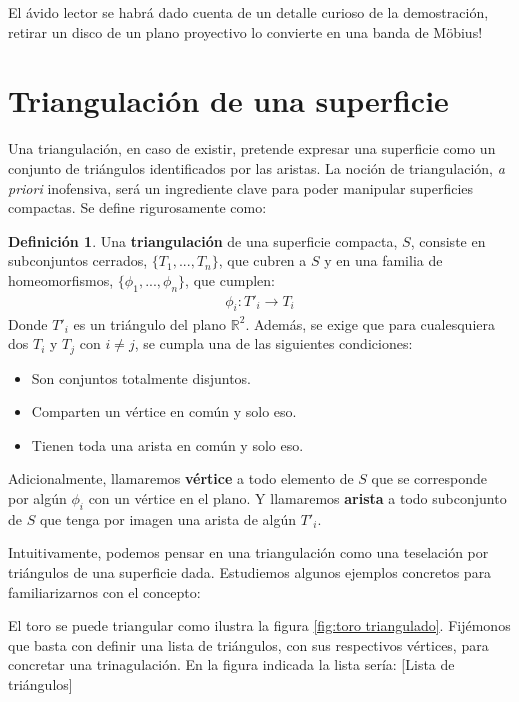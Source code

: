 \documentclass[a4paper,11pt,spanish, twoside, leqno]{tfg-uam}
\theoremstyle{definition}
\newtheorem{defin}[teor]{Definici\'on}
\begin{document}
El ávido lector se habrá dado cuenta de un detalle curioso de la demostración, retirar un disco de un plano proyectivo lo convierte en una banda de M\"obius!

\section{Triangulación de una superficie}
Una triangulación, en caso de existir, pretende expresar una superficie como un conjunto de triángulos identificados por las aristas. La noción de triangulación, \textit{a priori} inofensiva, será un ingrediente clave para poder manipular superficies compactas. Se define rigurosamente como:

\begin{defin}\label{defin:triangulacion}
	Una \textbf{triangulación} de una superficie compacta, $S$, consiste en subconjuntos cerrados, $\{T_1, ..., T_n\}$, que cubren a $S$ y en una familia de homeomorfismos, $\{\phi_1, ..., \phi_n\}$, que cumplen:
	\begin{align*}
	\phi_i: T'_i \longrightarrow T_i
	\end{align*}
	Donde $T'_i$ es un triángulo del plano $\mathbb{R}^2$.
	Además, se exige que para cualesquiera dos $T_i$ y $T_j$ con $i\neq j$, se cumpla una de las siguientes condiciones:
	\begin{itemize}
		\item 
		Son conjuntos totalmente disjuntos.
		\item 
		Comparten un vértice en común y solo eso.
		\item 
		Tienen toda una arista en común y solo eso.
	\end{itemize}
	Adicionalmente, llamaremos \textbf{vértice} a todo elemento de $S$ que se corresponde por algún $\phi_i$ con un vértice en el plano. Y llamaremos \textbf{arista} a todo subconjunto de $S$ que tenga por imagen una arista de algún $T'_i$.
\end{defin}


Intuitivamente, podemos pensar en una triangulación como una teselación por triángulos de una superficie dada. Estudiemos algunos ejemplos concretos para familiarizarnos con el concepto:

El toro se puede triangular como ilustra la figura  \ref{fig:toro triangulado}. Fijémonos que basta con definir una lista de triángulos, con sus respectivos vértices, para concretar una trinagulación. En la figura indicada la lista sería:
[Lista de triángulos]
\end{document}

